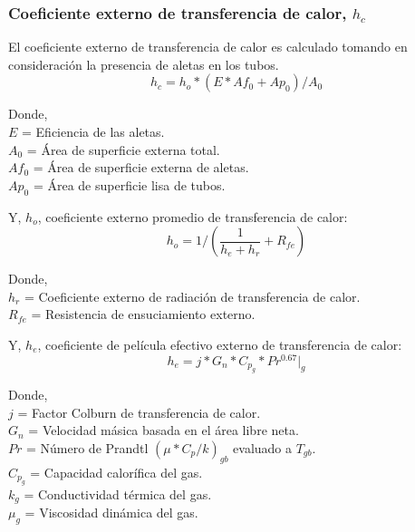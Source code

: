 \subsubsection{Coeficiente externo de transferencia de calor, $h_{c}$}
\par El coeficiente externo de transferencia de calor es calculado tomando en consideración la presencia de aletas en los tubos.
\begin{equation}
h_{c} = h_o * (E *Af_0 +Ap_0) / A_0
\end{equation}

\par Donde,\\
$E$ = Eficiencia de las aletas.\\
$A_0$ = Área de superficie externa total.\\
$Af_0$ = Área de superficie externa de aletas. \\
$Ap_0$ = Área de superficie lisa de tubos.
\par Y, $h_o$, coeficiente externo promedio de transferencia de calor: 
\begin{equation}
h_o = 1/(\frac{1}{h_e+h_r}+R_{fe})
\end{equation}

\par Donde,\\
$h_r$ = Coeficiente externo de radiación de transferencia de calor.\\
$R_{fe}$ = Resistencia de ensuciamiento externo.
\par Y, $h_e$, coeficiente de película efectivo externo de transferencia de calor: 
\begin{equation}
h_e = j *G_n *C_{p_g} *Pr^{0.67}|_g
\end{equation}

\par Donde,\\
$j$ = Factor Colburn de transferencia de calor.\\
$G_n$ = Velocidad másica basada en el área libre neta.\\
$Pr$ = Número de Prandtl $(\mu*C_p /k)_{gb}$ evaluado a $T_{gb}$.\\
$C_{p_g}$ = Capacidad calorífica del gas.\\
$k_g$ = Conductividad térmica del gas.\\
$\mu_g$ = Viscosidad dinámica del gas.

